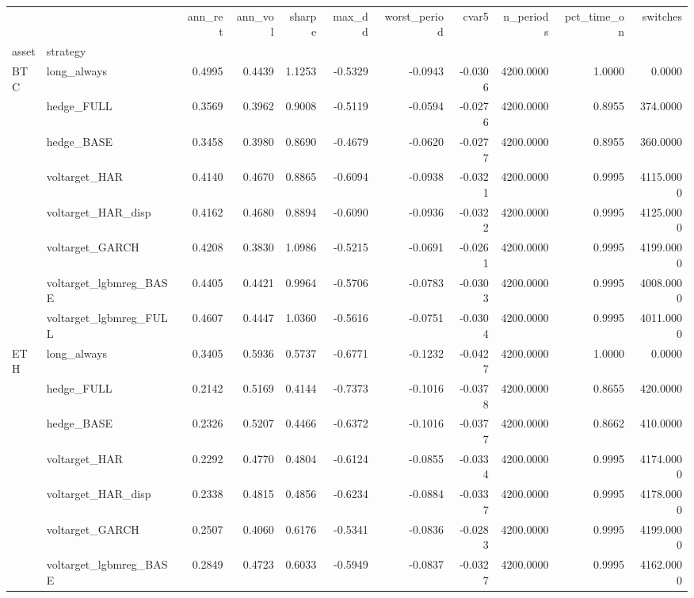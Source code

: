 \begin{tabular}{llrrrrrrrrr}
\toprule
 &  & ann_ret & ann_vol & sharpe & max_dd & worst_period & cvar5 & n_periods & pct_time_on & switches \\
asset & strategy &  &  &  &  &  &  &  &  &  \\
\midrule
\multirow[t]{8}{*}{BTC} & long_always & 0.4995 & 0.4439 & 1.1253 & -0.5329 & -0.0943 & -0.0306 & 4200.0000 & 1.0000 & 0.0000 \\
 & hedge_FULL & 0.3569 & 0.3962 & 0.9008 & -0.5119 & -0.0594 & -0.0276 & 4200.0000 & 0.8955 & 374.0000 \\
 & hedge_BASE & 0.3458 & 0.3980 & 0.8690 & -0.4679 & -0.0620 & -0.0277 & 4200.0000 & 0.8955 & 360.0000 \\
 & voltarget_HAR & 0.4140 & 0.4670 & 0.8865 & -0.6094 & -0.0938 & -0.0321 & 4200.0000 & 0.9995 & 4115.0000 \\
 & voltarget_HAR_disp & 0.4162 & 0.4680 & 0.8894 & -0.6090 & -0.0936 & -0.0322 & 4200.0000 & 0.9995 & 4125.0000 \\
 & voltarget_GARCH & 0.4208 & 0.3830 & 1.0986 & -0.5215 & -0.0691 & -0.0261 & 4200.0000 & 0.9995 & 4199.0000 \\
 & voltarget_lgbmreg_BASE & 0.4405 & 0.4421 & 0.9964 & -0.5706 & -0.0783 & -0.0303 & 4200.0000 & 0.9995 & 4008.0000 \\
 & voltarget_lgbmreg_FULL & 0.4607 & 0.4447 & 1.0360 & -0.5616 & -0.0751 & -0.0304 & 4200.0000 & 0.9995 & 4011.0000 \\
\cline{1-11}
\multirow[t]{8}{*}{ETH} & long_always & 0.3405 & 0.5936 & 0.5737 & -0.6771 & -0.1232 & -0.0427 & 4200.0000 & 1.0000 & 0.0000 \\
 & hedge_FULL & 0.2142 & 0.5169 & 0.4144 & -0.7373 & -0.1016 & -0.0378 & 4200.0000 & 0.8655 & 420.0000 \\
 & hedge_BASE & 0.2326 & 0.5207 & 0.4466 & -0.6372 & -0.1016 & -0.0377 & 4200.0000 & 0.8662 & 410.0000 \\
 & voltarget_HAR & 0.2292 & 0.4770 & 0.4804 & -0.6124 & -0.0855 & -0.0334 & 4200.0000 & 0.9995 & 4174.0000 \\
 & voltarget_HAR_disp & 0.2338 & 0.4815 & 0.4856 & -0.6234 & -0.0884 & -0.0337 & 4200.0000 & 0.9995 & 4178.0000 \\
 & voltarget_GARCH & 0.2507 & 0.4060 & 0.6176 & -0.5341 & -0.0836 & -0.0283 & 4200.0000 & 0.9995 & 4199.0000 \\
 & voltarget_lgbmreg_BASE & 0.2849 & 0.4723 & 0.6033 & -0.5949 & -0.0837 & -0.0327 & 4200.0000 & 0.9995 & 4162.0000 \\

\end{tabular}
